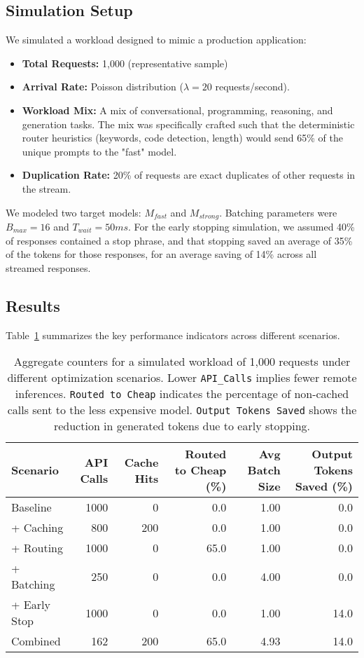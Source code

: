 \documentclass[11pt]{article}
\begin{document}
\subsection{Simulation Setup}
We simulated a workload designed to mimic a production application:
\begin{itemize}
    \item \textbf{Total Requests:} 1,000 (representative sample)
    \item \textbf{Arrival Rate:} Poisson distribution ($\lambda=20$ requests/second).
    \item \textbf{Workload Mix:} A mix of conversational, programming, reasoning, and generation tasks. The mix was specifically crafted such that the deterministic router heuristics (keywords, code detection, length) would send 65\% of the unique prompts to the "fast" model.
    \item \textbf{Duplication Rate:} 20\% of requests are exact duplicates of other requests in the stream.
\end{itemize}
We modeled two target models: $M_{fast}$ and $M_{strong}$. Batching parameters were $B_{max}=16$ and $T_{wait}=50ms$. For the early stopping simulation, we assumed 40\% of responses contained a stop phrase, and that stopping saved an average of 35\% of the tokens for those responses, for an average saving of 14\% across all streamed responses.

\subsection{Results}
Table~\ref{tab:results} summarizes the key performance indicators across different scenarios.

\begin{table}[h]
\centering
\begin{tabular}{lrrrrr}
\toprule
Scenario & API Calls & Cache Hits & Routed to Cheap (\%) & Avg Batch Size & Output Tokens Saved (\%) \\
\midrule
Baseline & 1000 & 0 & 0.0 & 1.00 & 0.0 \\
+ Caching & 800 & 200 & 0.0 & 1.00 & 0.0 \\
+ Routing & 1000 & 0 & 65.0 & 1.00 & 0.0 \\
+ Batching & 250 & 0 & 0.0 & 4.00 & 0.0 \\
+ Early Stop & 1000 & 0 & 0.0 & 1.00 & 14.0 \\
Combined & 162 & 200 & 65.0 & 4.93 & 14.0 \\
\bottomrule
\end{tabular}
\caption{Aggregate counters for a simulated workload of 1,000 requests under different optimization scenarios. Lower \texttt{API\_Calls} implies fewer remote inferences. \texttt{Routed to Cheap} indicates the percentage of non-cached calls sent to the less expensive model. \texttt{Output Tokens Saved} shows the reduction in generated tokens due to early stopping.}
\label{tab:results}
\end{table}
\end{document}

